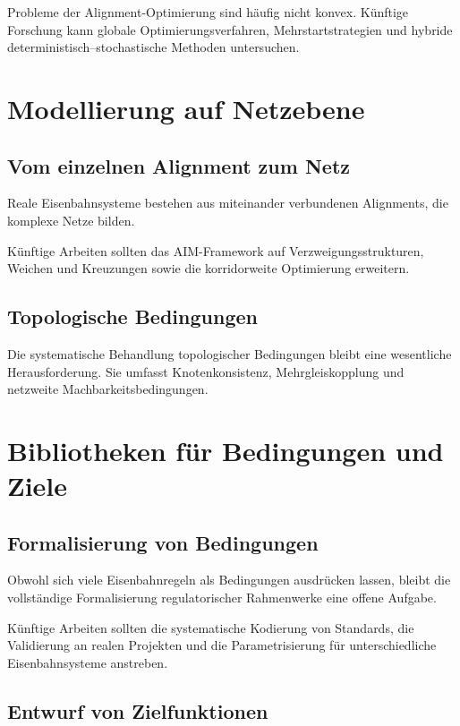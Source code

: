 Probleme der Alignment-Optimierung sind häufig nicht konvex. Künftige
Forschung kann globale Optimierungsverfahren, Mehrstartstrategien und
hybride deterministisch--stochastische Methoden untersuchen.

\section{Modellierung auf Netzebene}

\subsection{Vom einzelnen Alignment zum Netz}

Reale Eisenbahnsysteme bestehen aus miteinander verbundenen Alignments,
die komplexe Netze bilden.

Künftige Arbeiten sollten das AIM-Framework auf Verzweigungsstrukturen,
Weichen und Kreuzungen sowie die korridorweite Optimierung erweitern.

\subsection{Topologische Bedingungen}

Die systematische Behandlung topologischer Bedingungen bleibt eine
wesentliche Herausforderung. Sie umfasst Knotenkonsistenz,
Mehrgleiskopplung und netzweite Machbarkeitsbedingungen.

\section{Bibliotheken für Bedingungen und Ziele}

\subsection{Formalisierung von Bedingungen}

Obwohl sich viele Eisenbahnregeln als Bedingungen ausdrücken lassen,
bleibt die vollständige Formalisierung regulatorischer Rahmenwerke eine
offene Aufgabe.

Künftige Arbeiten sollten die systematische Kodierung von Standards, die
Validierung an realen Projekten und die Parametrisierung für
unterschiedliche Eisenbahnsysteme anstreben.

\subsection{Entwurf von Zielfunktionen}

